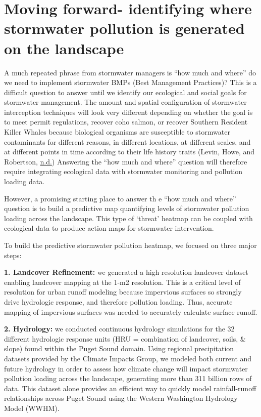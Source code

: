 \documentclass[
]{report}
\begin{document}
\hypertarget{moving-forward--identifying-where-stormwater-pollution-is-generated-on-the-landscape}{%
\section{Moving forward- identifying where stormwater pollution is generated on the landscape}\label{moving-forward--identifying-where-stormwater-pollution-is-generated-on-the-landscape}}

A much repeated phrase from stormwater managers is ``how much and where'' do we need to implement stormwater BMPs (Best Management Practices)? This is a difficult question to answer until we identify our ecological and social goals for stormwater management. The amount and spatial configuration of stormwater interception techniques will look very different depending on whether the goal is to meet permit regulations, recover coho salmon, or recover Southern Resident Killer Whales because biological organisms are susceptible to stormwater contaminants for different reasons, in different locations, at different scales, and at different points in time according to their life history traits (Levin, Howe, and Robertson, \protect\hyperlink{ref-Levin}{n.d.}) Answering the ``how much and where'' question will therefore require integrating ecological data with stormwater monitoring and pollution loading data.

However, a promising starting place to answer th e ``how much and where'' question is to build a predictive map quantifying levels of stormwater pollution loading across the landscape. This type of `threat' heatmap can be coupled with ecological data to produce action maps for stormwater intervention.

To build the predictive stormwater pollution heatmap, we focused on three major steps:

\textbf{1. Landcover Refinement:} we generated a high resolution landcover dataset enabling landcover mapping at the 1-m2 resolution. This is a critical level of resolution for urban runoff modeling because impervious surfaces so strongly drive hydrologic response, and therefore pollution loading. Thus, accurate mapping of impervious surfaces was needed to accurately calculate surface runoff.

\textbf{2. Hydrology:} we conducted continuous hydrology simulations for the 32 different hydrologic response units (HRU = combination of landcover, soils, \& slope) found within the Puget Sound domain. Using regional precipitation datasets provided by the Climate Impacts Group, we modeled both current and future hydrology in order to assess how climate change will impact stormwater pollution loading across the landscape, generating more than 311 billion rows of data. This dataset alone provides an efficient way to quickly model rainfall-runoff relationships across Puget Sound using the Western Washington Hydrology Model (WWHM).
\end{document}
